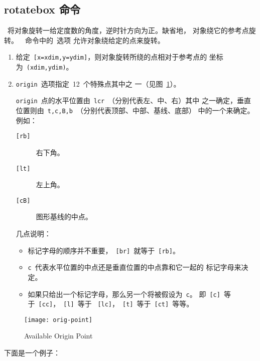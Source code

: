 \subsection{rotatebox 命令}\label{ssec:rotatebox}

{\large\hspace{1cm}
	}

~将对象旋转一给定度数的角度，逆时针方向为正。缺省地，
对象绕它的参考点旋转。~~命令中的~{选项}
允许对象绕给定的点来旋转。

\begin{enumerate}
	\item 给定~\verb+[x=xdim,y=ydim]+，则对象旋转所绕的点相对于参考点的
	坐标为~\verb+(xdim,ydim)+。
	\item \texttt{origin}~选项指定~12~个特殊点其中之
	一（见图~\ref{fig:rotatepoint}）。
	
	\texttt{origin}~点的水平位置由~\texttt{lcr}~（分别代表左、中、右）其中
	之一确定，垂直位置则由~\texttt{t,c,B,b}~（分别代表顶部、中部、基线、底部）
	中的一个来确定。例如：
	\begin{description}
		\item [\texttt{[rb]}] 右下角。
		\item [\texttt{[lt]}] 左上角。
		\item [\texttt{[cB]}] 图形基线的中点。
	\end{description}
	{几点说明：}
	\begin{itemize}
		\item 标记字母的顺序并不重要，~\texttt{[br]}~就等于~\texttt{[rb]}。
		\item \texttt{c}~代表水平位置的中点还是垂直位置的中点靠和它一起的
		标记字母来决定。
		\item 如果只给出一个标记字母，那么另一个将被假设为~\texttt{c}。
		即~\texttt{[c]}~等于~\texttt{[cc]}，~\texttt{[l]}~等于
		~\texttt{[lc]}，~\texttt{[t]}~等于~\texttt{[ct]}~等等。
	\end{itemize}
\end{enumerate}

\begin{figure}
	\centering
	\texttt{[image: orig-point]}
	\caption{Available Origin Point}\label{fig:rotatepoint}
\end{figure}

\noindent 下面是一个例子：

